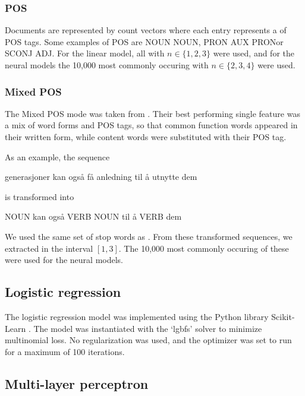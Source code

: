 \subsubsection*{POS \ngrams}

Documents are represented by count vectors where each entry represents a
\ngram of POS tags. Some examples of POS \ngrams are \textlangle NOUN
NOUN\textrangle, \textlangle PRON AUX PRON\textrangle or \textlangle SCONJ
ADJ\textrangle. For the linear model, all \ngrams with $n\in \{1,2,3\}$ were
used, and for the neural models the 10,000 most commonly occuring \ngrams
with $n\in \{2,3,4\}$ were used.

\subsubsection*{Mixed POS}

The Mixed POS mode was taken from \textcite{malmasi15}. Their best performing
single feature was a mix of word forms and POS tags, so that common function
words appeared in their written form, while content words were substituted
with their POS tag.

As an example, the sequence 
\begin{displayquote}
generasjoner kan også få anledning til å utnytte dem
\end{displayquote}
is transformed into
\begin{displayquote}
NOUN kan også VERB NOUN til å VERB dem
\end{displayquote}

We used the same set of stop words as \citeauthor{malmasi15}. From these
transformed sequences, we extracted \ngrams in the interval $[1,3]$. The
10,000 most commonly occuring of these were used for the neural models.


\subsection{Logistic regression}

The logistic regression model was implemented using the Python library
Scikit-Learn \autocite{scikit-learn}. The model was instantiated with the
`lgbfs' solver to minimize multinomial loss. No regularization was used, and
the optimizer was set to run for a maximum of 100 iterations.


\subsection{Multi-layer perceptron}
\label{subsec:mlp}

